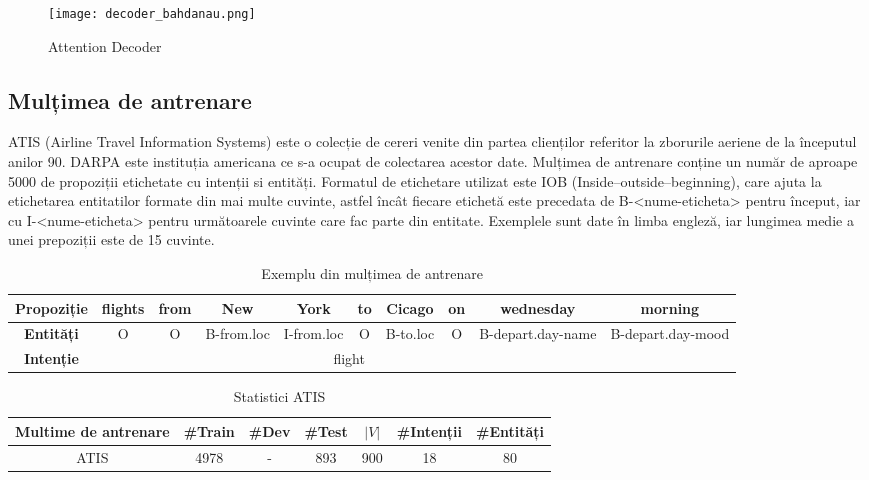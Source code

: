 \begin{figure}[h]
	\centering
	\texttt{[image: decoder\_bahdanau.png]}
	\caption{Attention Decoder}
	\label{fig:dec_bah}
\end{figure}

\subsection{Mulțimea de antrenare}
ATIS (Airline Travel Information Systems) \cite{atis} este o colecție de cereri venite din partea clienților referitor la zborurile aeriene de la începutul anilor 90. DARPA este instituția americana ce s-a ocupat de colectarea acestor date. Mulțimea de antrenare conține un număr de aproape 5000 de propoziții etichetate cu intenții si entități. Formatul de etichetare utilizat este IOB (Inside–outside–beginning), care ajuta la etichetarea entitatilor formate din mai multe cuvinte, astfel încât fiecare etichetă este precedata de B-<nume-eticheta> pentru început, iar cu I-<nume-eticheta> pentru următoarele cuvinte care fac parte din entitate. Exemplele sunt date în limba engleză, iar lungimea medie a unei prepoziții este de 15 cuvinte.

\begin{table}
	\centering
	\caption{Exemplu din mulțimea de antrenare}
	\label{atis_example}
	\begin{adjustbox}{max width=\textwidth}
		\begin{tabular}{ |c|c|c|c|c|c|c|c|c|c| } 
			\hline
			\textbf{Propoziție} & flights & from & New & York & to & Cicago & on & wednesday & morning \\ 
			\hline
			\textbf{Entități} & O & O & B-from.loc & I-from.loc & O & B-to.loc & O & B-depart.day-name & B-depart.day-mood \\
			\hline
			\textbf{Intenție} & \multicolumn{8}{c}{flight} &  \\ 
			\hline
		\end{tabular}
	\end{adjustbox}
\end{table}

\begin{table}
	\centering
	\caption{Statistici ATIS}
	\label{atis_stats}
	\begin{adjustbox}{max width=\textwidth}
		\begin{tabular}{ |c|c|c|c|c|c|c| } 
			\hline
			\textbf{Multime de antrenare} & \#Train & \#Dev & \#Test & $|V|$ & \#Intenții & \#Entități \\ 
			\hline
			ATIS & 4978 & - & 893 & 900 & 18 & 80 \\
			\hline
		\end{tabular}
	\end{adjustbox}
\end{table}




